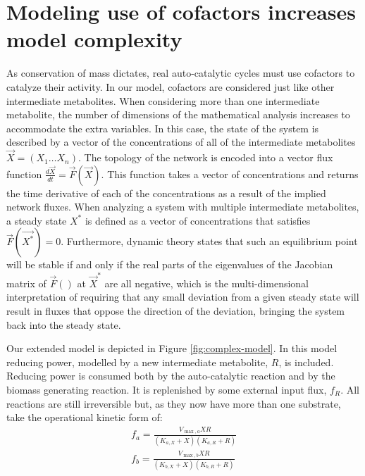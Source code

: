\documentclass[a4page,notitlepage]{article}
\begin{document}
\section{Modeling use of cofactors increases model complexity}
    As conservation of mass dictates, real auto-catalytic cycles must use cofactors to catalyze their activity.
    In our model, cofactors are considered just like other intermediate metabolites.
    When considering more than one intermediate metabolite, the number of dimensions of the mathematical analysis increases to accommodate the extra variables.
    In this case, the state of the system is described by a vector of the concentrations of all of the intermediate metabolites $\vec{X} = (X_1\dots X_n)$.
    The topology of the network is encoded into a vector flux function $\frac{d\vec{X}}{dt}=\vec{F}(\vec{X})$.
    This function takes a vector of concentrations and returns the time derivative of each of the concentrations as a result of the implied network fluxes.
    When analyzing a system with multiple intermediate metabolites, a steady state $X^*$ is defined as a vector of concentrations that satisfies $\vec{F}(\vec{X^*}) = 0$.
    Furthermore, dynamic theory states that such an equilibrium point will be stable if and only if the real parts of the eigenvalues of the Jacobian matrix of $\vec{F}()$ at $\vec{X}^*$ are all negative, which is the multi-dimensional interpretation of requiring that any small deviation from a given steady state will result in fluxes that oppose the direction of the deviation, bringing the system back into the steady state.

    Our extended model is depicted in Figure \ref{fig:complex-model}.
    In this model reducing power, modelled by a new intermediate metabolite, $R$, is included.
    Reducing power is consumed both by the auto-catalytic reaction and by the biomass generating reaction.
    It is replenished by some external input flux, $f_R$.
    All reactions are still irreversible but, as they now have more than one substrate, take the operational kinetic form of:
    \begin{eqnarray*}
        f_a=\frac{V_{\max,a}XR}{(K_{a,X}+X)(K_{a,R}+R)} \\
        f_b=\frac{V_{\max,b}XR}{(K_{b,X}+X)(K_{b,R}+R)}
    \end{eqnarray*}
\end{document}
